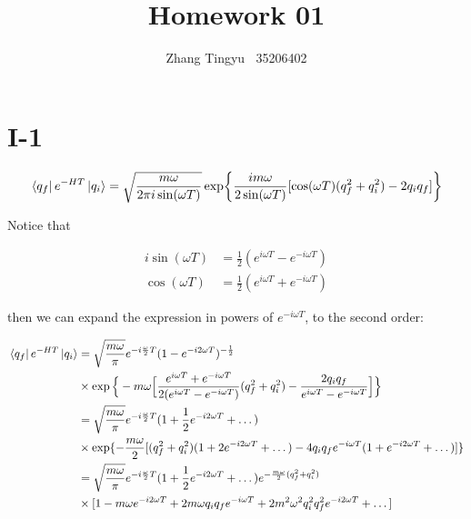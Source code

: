 \documentclass[12pt]{article}
\title{Homework 01}
\author{Zhang Tingyu $\ $ 35206402}
\begin{document}
\maketitle

\section*{I-1}

\begin{equation*}
    \bra*{q_f}e^{-HT}\ket*{q_i}=\sqrt{\frac{m\omega}{2\pi i\sin(\omega T)}}
    \exp{\frac{im\omega}{2\sin(\omega T)}[\cos(\omega T)(q_f^2+q_i^2)-2q_iq_f]}
\end{equation*}

Notice that

\begin{equation*}
    \begin{split}
        i\sin(\omega T)&=\frac{1}{2}(e^{i\omega T}-e^{-i\omega T})\\
        \cos(\omega T)&=\frac{1}{2}(e^{i\omega T}+e^{-i\omega T})
    \end{split}
\end{equation*}

then we can expand the expression in powers of $e^{-i\omega T}$, to the 
second order:

\begin{equation*}
    \begin{split}
        \bra*{q_f}e^{-HT}\ket*{q_i}&=\sqrt{\frac{m\omega}{\pi}}e^{-i
        \frac{\omega}{2}T}(1-e^{-i2\omega T})^{-\frac{1}{2}}\\
        &\times\exp\Big\{-m\omega\Big[\frac{e^{i\omega T}+e^{-i\omega T}}
        {2(e^{i\omega T}-e^{-i\omega T})}(q_f^2+q_i^2)-\frac{2q_iq_f}
        {e^{i\omega T}-e^{-i\omega T}}\Big]\Big\}\\
        &=\sqrt{\frac{m\omega}{\pi}}e^{-i\frac{\omega}{2}T}(1+\frac{1}{2}
        e^{-i2\omega T}+\dots)\\
        &\times\exp\{-\frac{m\omega}{2}[(q_f^2+q_i^2)(1+2e^{-i2\omega T}+
        \dots)-4q_iq_fe^{-i\omega T}(1+e^{-i2\omega T}+\dots)]\}\\
        &=\sqrt{\frac{m\omega}{\pi}}e^{-i\frac{\omega}{2}T}(1+\frac{1}{2}
        e^{-i2\omega T}+\dots)e^{-\frac{m\omega}{2}(q_f^2+q_i^2)}\\
        &\times[1-m\omega e^{-i2\omega T}+2m\omega q_iq_fe^{-i\omega T}+
        2m^2\omega^2q_i^2q_f^2e^{-i2\omega T}+\dots]
    \end{split}
\end{equation*}
\end{document}
